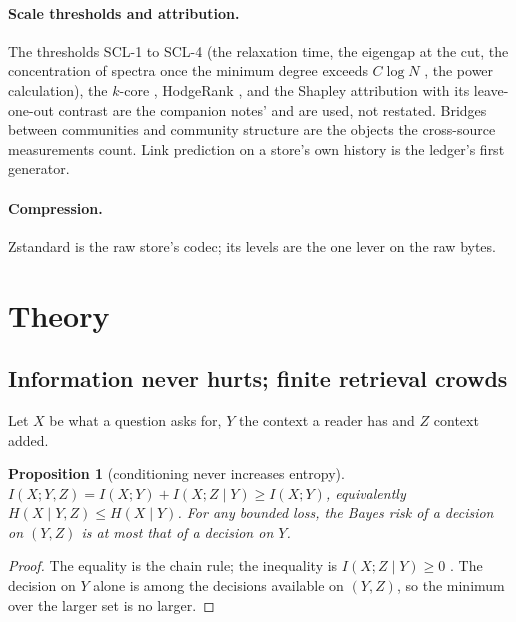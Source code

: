 \documentclass[11pt]{article}
\theoremstyle{plain}
\newtheorem{proposition}[theorem]{Proposition}
\theoremstyle{definition}
\theoremstyle{remark}
\begin{document}
\paragraph{Scale thresholds and attribution.} The thresholds SCL-1 to SCL-4 (the relaxation time,
the eigengap at the cut, the concentration of spectra once the minimum degree exceeds $C\log N$
\citep{oliveira2009concentration,chung2011spectra}, the power calculation), the $k$-core
\citep{seidman1983cores}, HodgeRank \citep{jiang2011hodgerank}, and the Shapley attribution
\citep{shapley1953value,castro2009polynomial} with its leave-one-out contrast are the companion
notes' and are used, not restated. Bridges between communities \citep{granovetter1973weak}
and community structure \citep{newman2006modularity,fortunato2010community} are the objects the
cross-source measurements count. Link prediction on a store's own history
\citep{libennowell2007link} is the ledger's first generator.

\paragraph{Compression.} Zstandard \citep{rfc8878} is the raw store's codec; its levels are the one
lever on the raw bytes.

\section{Theory}\label{sec:theory}

\subsection{Information never hurts; finite retrieval crowds}\label{sec:crowding}
Let $X$ be what a question asks for, $Y$ the context a reader has and $Z$ context added.

\begin{proposition}[conditioning never increases entropy]\label{prop:info}
$I(X;Y,Z) = I(X;Y) + I(X;Z\mid Y) \ge I(X;Y)$, equivalently $H(X\mid Y,Z)\le H(X\mid Y)$. For any
bounded loss, the Bayes risk of a decision on $(Y,Z)$ is at most that of a decision on $Y$.
\end{proposition}
\begin{proof}
The equality is the chain rule; the inequality is $I(X;Z\mid Y)\ge 0$ \citep[2.5.2, 2.6.3]{cover2006}.
The decision on $Y$ alone is among the decisions available on $(Y,Z)$, so the minimum over the
larger set is no larger.
\end{proof}
\end{document}
